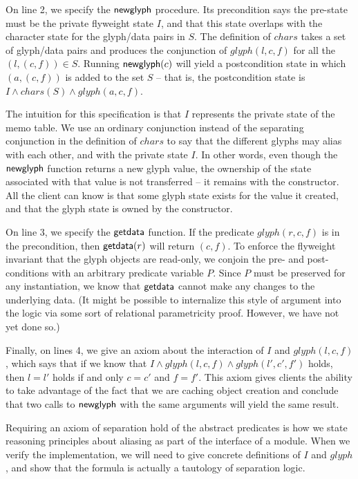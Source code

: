 \documentclass[preprint,natbib]{sigplanconf}
\begin{document}
On line 2, we specify the $\mbox{\textsf{{newglyph}}}$ procedure. Its
precondition says the pre-state must be the private flyweight state
$I$, and that this state overlaps with the character state for the
glyph/data pairs in $S$. The definition of $chars$ takes a set of
glyph/data pairs and produces the conjunction of $glyph(l,c,f)$ for
all the $(l,(c,f)) \in S$. Running $\mbox{\textsf{{newglyph}}}(c)$ will yield a
postcondition state in which $(a, (c,f))$ is added to the set $S$ --
that is, the postcondition state is $I \land chars(S) \land
glyph(a,c,f)$.

The intuition for this specification is that $I$ represents the
private state of the memo table. We use an ordinary conjunction
instead of the separating conjunction in the definition of $chars$ to
say that the different glyphs may alias with each other, and with the
private state $I$. In other words, even though the $\mbox{\textsf{{newglyph}}}$
function returns a new glyph value, the ownership of the state
associated with that value is not transferred -- it remains with the
constructor. All the client can know is that some glyph state exists
for the value it created, and that the glyph state is owned by the
constructor.

On line 3, we specify the $\mbox{\textsf{{getdata}}}$ function. If the predicate
$glyph(r, c, f)$ is in the precondition, then $\mbox{\textsf{{getdata}}}(r)$
will return $(c, f)$.  To enforce the flyweight invariant that the
glyph objects are read-only, we conjoin the pre- and post-conditions
with an arbitrary predicate variable $P$. Since $P$ must be preserved
for any instantiation, we know that $\mbox{\textsf{{getdata}}}$ cannot make any
changes to the underlying data. (It might be possible to internalize
this style of argument into the logic via some sort of relational
parametricity proof. However, we have not yet done so.)

Finally, on lines 4, we give an axiom about the interaction of $I$ and
$glyph(l,c,f)$, which says that if we know that $I \land glyph(l,c,f)
\land glyph(l',c', f')$ holds, then $l = l'$ holds if and only $c =
c'$ and $f = f'$. This axiom gives clients the ability to take
advantage of the fact that we are caching object creation and conclude
that two calls to $\mbox{\textsf{{newglyph}}}$ with the same arguments will
yield the same result. 

Requiring an axiom of separation hold of the abstract predicates is
how we state reasoning principles about aliasing as part of the
interface of a module. When we verify the implementation, we will need
to give concrete definitions of $I$ and $glyph$, and show that the
formula is actually a tautology of separation logic.
\end{document}

